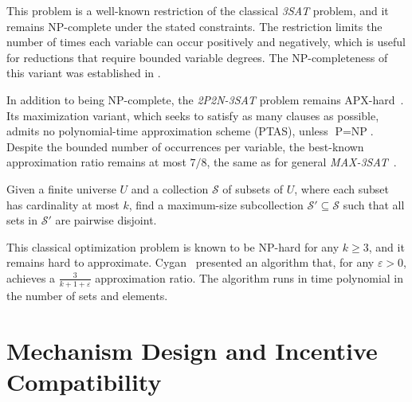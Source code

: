 This problem is a well-known restriction of the classical \textit{3SAT} problem, and it remains NP-complete under the stated constraints. The restriction limits the number of times each variable can occur positively and negatively, which is useful for reductions that require bounded variable degrees. The NP-completeness of this variant was established in \cite{berman2004approximation}.

In addition to being NP-complete, the \textit{2P2N-3SAT} problem remains APX-hard~\cite{berman2004approximation}. Its maximization variant, which seeks to satisfy as many clauses as possible, admits no polynomial-time approximation scheme (PTAS), unless $\text{P} = \text{NP}$. Despite the bounded number of occurrences per variable, the best-known approximation ratio remains at most $7/8$, the same as for general \textit{MAX-3SAT}~\cite{hastad2001optimal}.


\begin{problem}
\label{prob:k_set_packing}

Given a finite universe $U$ and a collection $\mathcal{S}$ of subsets of $U$, where each subset has cardinality at most $k$, find a maximum-size subcollection $\mathcal{S}' \subseteq \mathcal{S}$ such that all sets in $\mathcal{S}'$ are pairwise disjoint.
\end{problem}

This classical optimization problem is known to be NP-hard for any $k \geq 3$, and it remains hard to approximate. Cygan~\cite{cygan2013improved} presented an algorithm that, for any $\varepsilon > 0$, achieves a $\frac{3}{k + 1 + \varepsilon}$ approximation ratio. The algorithm runs in time polynomial in the number of sets and elements.





\section{Mechanism Design and Incentive Compatibility}

